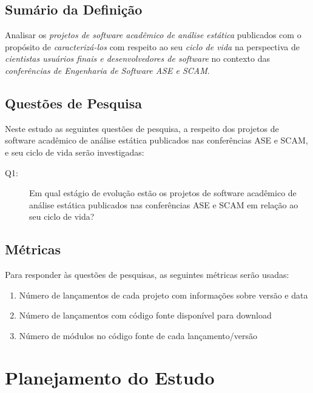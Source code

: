 \subsection{Sumário da Definição}

Analisar os \textit{projetos de software acadêmico de análise estática} publicados
com o propósito de \textit{caracterizá-los}
com respeito ao seu \textit{ciclo de vida}
na perspectiva de \textit{cientistas usuários finais e desenvolvedores de software}
no contexto das \textit{conferências de Engenharia de Software ASE e SCAM}.

\subsection{Questões de Pesquisa}

Neste estudo as seguintes questões de pesquisa, a respeito dos projetos de
software acadêmico de análise estática publicados nas conferências ASE e SCAM,
e seu ciclo de vida serão investigadas:

\newcommand{\EstudoTresQuestaoUm}{
  Em qual estágio de evolução estão os projetos de software acadêmico de
  análise estática publicados nas conferências ASE e SCAM em relação ao seu
  ciclo de vida?
}

\begin{description}
  \item [Q1:] \EstudoTresQuestaoUm
\end{description}

\subsection{Métricas}

Para responder às questões de pesquisas, as seguintes métricas serão usadas:

\begin{enumerate}
  \item Número de lançamentos de cada projeto com informações sobre versão e data
  \item Número de lançamentos com código fonte disponível para download
  \item Número de módulos no código fonte de cada lançamento/versão
\end{enumerate}


\section{Planejamento do Estudo} \label{estudo3:planejamento}

